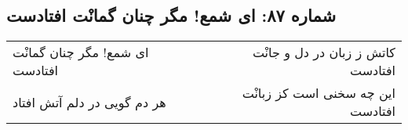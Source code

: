 \begin{center}
\section*{شماره ۸۷: ای شمع! مگر چنان گمانْت افتادست}
\label{sec:087}
\begin{longtable}{l p{0.5cm} r}
ای شمع! مگر چنان گمانْت افتادست
&&
کاتش ز زبان در دل و جانْت افتادست
\\
هر دم گویی در دلم آتش افتاد
&&
این چه سخنی است کز زبانْت افتادست
\\
\end{longtable}
\end{center}
